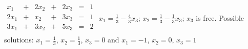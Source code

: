 {$\begin{array}{KQKQKQQ}
x_1&+&2x_2&+&2x_3&=&1\\
2x_1&+&x_2&+&3x_3&=&1\\
3x_1&+&3x_2&+&5x_3&=&2\\
\end{array}$}
{$x_1=\frac13-\frac43x_3$; $x_2=\frac13-\frac13x_3$; $x_3$ is free. Possible solutions: $x_1 = \frac13$, $x_2=\frac13$, $x_3=0$ and $x_1 = -1$, $x_2 = 0$, $x_3=1$}
